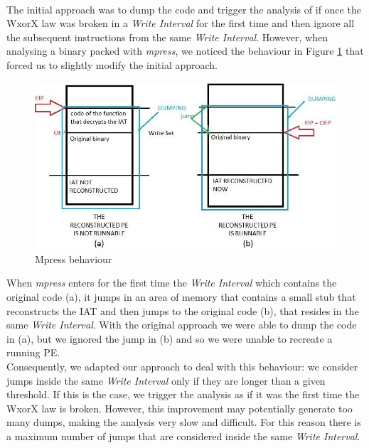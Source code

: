 \paragraph{}
The initial approach was to dump the code and trigger the analysis of if once the \ac{WxorX} law was broken in a \textit{Write Interval} for the first time and then ignore all the subsequent instructions from the same \textit{Write Interval}. However, when analysing a binary packed with \textit{mpress}, we noticed the behaviour in Figure \ref{mpress behaviour} that forced us to slightly modify the initial approach.\\
\begin{figure}[!ht]
	\begin{center}
   		\includegraphics [width=\textwidth]{./pictures/InterWriteSet Analysis - mpress.jpg}
	\end{center}
	\caption{Mpress behaviour}
	\label{mpress behaviour}
\end{figure}
When \textit{mpress} enters for the first time the \textit{Write Interval} which contains the original code (a), it jumps in an area of memory that contains a small stub that reconstructs the \ac{IAT} and then jumps to the original code (b), that resides in the same \textit{Write Interval}. With the original approach we were able to dump the code in (a), but we ignored the jump in (b) and so we were unable to recreate a running \ac{PE}.\\
Consequently, we adapted our approach to deal with this behaviour: we consider jumps inside the same \textit{Write Interval} only if they are longer than a given threshold. If this is the case, we trigger the analysis as if it was the first time the \ac{WxorX} law is broken. However, this improvement may potentially generate too many dumps, making the analysis very slow and difficult. For this reason there is a maximum number of jumps that are considered inside the same \textit{Write Interval}.